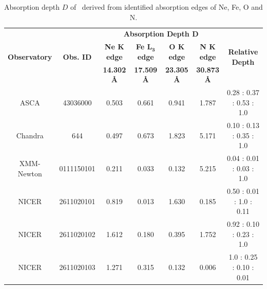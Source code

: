 			\begin{landscape}
		    \renewcommand{\arraystretch}{2.2}
		    \begin{table}[!htb]
		    	\centering
		    	\caption{Absorption depth $D$ of \source\ derived from identified absorption edges of Ne, Fe, O and N.}
		    	\label{tab:abs-depth}
				\begin{tabular}{ccccccc}
					\hline
					\multirow{3}{*}{\textbf{Observatory}} & \multirow{3}{*}{\textbf{Obs. ID}} & \multicolumn{4}{c}{\textbf{Absorption Depth $\boldsymbol{D}$}} & \multirow{3}{*}{\textbf{Relative Depth}} \\ \cline{3-6} & & \textbf{Ne $\boldsymbol{K}$ edge} & \textbf{Fe $\boldsymbol{L_3}$ edge} & \textbf{O $\boldsymbol{K}$ edge} & \textbf{N $\boldsymbol{K}$ edge} \\ \cline{3-6} & & \textbf{14.302 \AA} & \textbf{17.509 \AA} & \textbf{23.305 \AA} & \textbf{30.873 \AA} \\
					\hline
					{ASCA} & {43036000} & {0.503} & {0.661} & {0.941} & {1.787} & {0.28 : 0.37 : 0.53 : 1.0} \\ %
					{Chandra} & {644} & {0.497} & {0.673} & {1.823} & {5.171} & {0.10 : 0.13 : 0.35 : 1.0} \\ %
					{XMM-Newton} & {0111150101} & {0.211} & {0.033} & {0.132} & {5.215} & {0.04 : 0.01 : 0.03 : 1.0} \\ %
					{NICER} & {2611020101} & {0.819} & {0.013} & {1.630} & {0.185} & {0.50 : 0.01 : 1.0 : 0.11} \\ %
					{NICER} & {2611020102} & {1.612} & {0.180} & {0.395} & {1.752} & {0.92 : 0.10 : 0.23 : 1.0} \\ %
					{NICER} & {2611020103} & {1.271} & {0.315} & {0.132} & {0.006} & {1.0 : 0.25 : 0.10 : 0.01} \\ %
					\hline
				\end{tabular}
			\end{table}
			\renewcommand{\arraystretch}{1.6}
		    \end{landscape}

    	
